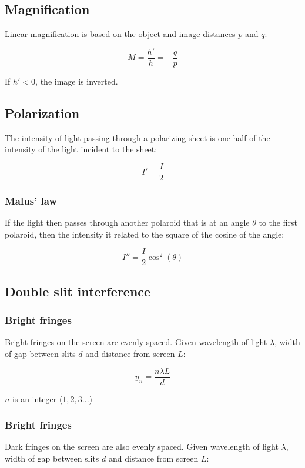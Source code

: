 \documentclass[12pt]{article}
\begin{document}
\subsection{Magnification}

Linear magnification is based on the object and image distances $p$ and $q$:

\[
\boxed{
M = \frac{h'}{h} = -\frac{q}{p}
}
\]

If $h' < 0$, the image is inverted.

\subsection{Polarization}

The intensity of light passing through a polarizing sheet is one half of the intensity of the light incident to the sheet:

\[
\boxed{
I' = \frac{I}{2}
}
\]

\subsubsection{Malus' law}

If the light then passes through another polaroid that is at an angle $\theta$ to the first polaroid, then the intensity it related to the square of the cosine of the angle:

\[
\boxed{
I'' = \frac{I}{2}\cos^2 (\theta)
}
\]

\subsection{Double slit interference}

\subsubsection{Bright fringes}

Bright fringes on the screen are evenly spaced.
Given wavelength of light $\lambda$, width of gap between slits $d$ and distance from screen $L$:

\[
\boxed{
y_n = \frac{n\lambda L}{d}
}
\]

$n$ is an integer ($1, 2, 3 ...$)

\subsubsection{Bright fringes}

Dark fringes on the screen are also evenly spaced.
Given wavelength of light $\lambda$, width of gap between slits $d$ and distance from screen $L$:
\end{document}
